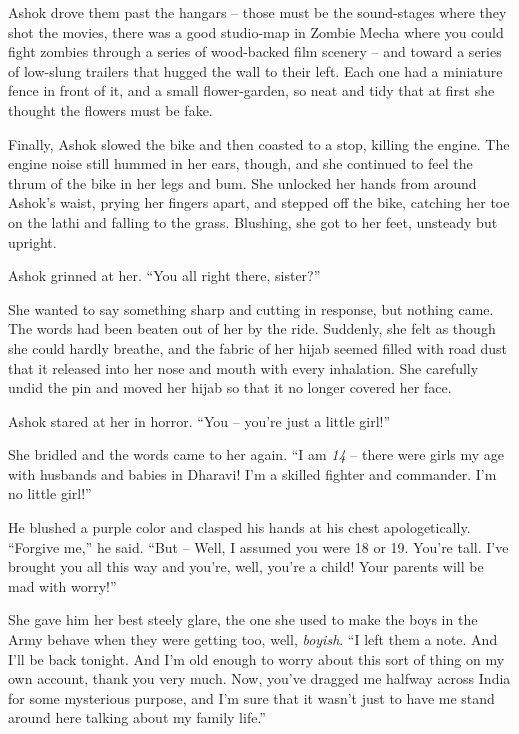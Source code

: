 Ashok drove them past the hangars -- those must be the sound-stages
where they shot the movies, there was a good studio-map in Zombie
Mecha where you could fight zombies through a series of wood-backed
film scenery -- and toward a series of low-slung trailers that
hugged the wall to their left. Each one had a miniature fence in
front of it, and a small flower-garden, so neat and tidy that at
first she thought the flowers must be fake.

Finally, Ashok slowed the bike and then coasted to a stop, killing
the engine. The engine noise still hummed in her ears, though, and
she continued to feel the thrum of the bike in her legs and bum.
She unlocked her hands from around Ashok's waist, prying her
fingers apart, and stepped off the bike, catching her toe on the
lathi and falling to the grass. Blushing, she got to her feet,
unsteady but upright.

Ashok grinned at her. ``You all right there, sister?''

She wanted to say something sharp and cutting in response, but
nothing came. The words had been beaten out of her by the ride.
Suddenly, she felt as though she could hardly breathe, and the
fabric of her hijab seemed filled with road dust that it released
into her nose and mouth with every inhalation. She carefully undid
the pin and moved her hijab so that it no longer covered her face.

Ashok stared at her in horror. ``You -- you're just a little girl!''

She bridled and the words came to her again. ``I am \emph{14} --
there were girls my age with husbands and babies in Dharavi! I'm a
skilled fighter and commander. I'm no little girl!''

He blushed a purple color and clasped his hands at his chest
apologetically. ``Forgive me,'' he said. ``But -- Well, I assumed you
were 18 or 19. You're tall. I've brought you all this way and
you're, well, you're a child! Your parents will be mad with
worry!''

She gave him her best steely glare, the one she used to make the
boys in the Army behave when they were getting too, well,
\emph{boyish}. ``I left them a note. And I'll be back tonight. And
I'm old enough to worry about this sort of thing on my own account,
thank you very much. Now, you've dragged me halfway across India
for some mysterious purpose, and I'm sure that it wasn't just to
have me stand around here talking about my family life.''

